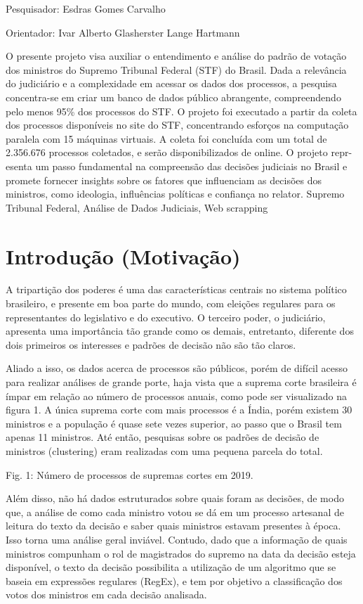     {
        \noindent Pesquisador: Esdras Gomes Carvalho

        \noindent Orientador: Ivar Alberto Glasherster Lange Hartmann
    }
    {O presente projeto visa auxiliar o entendimento e análise do padrão de votação dos ministros do Supremo Tribunal Federal (STF) do Brasil. Dada a relevância do judiciário e a complexidade em acessar os dados dos processos, a pesquisa concentra-se em criar um banco de dados público abrangente, compreendendo pelo menos 95\% dos processos do STF. O projeto foi executado a partir da coleta dos processos disponíveis no site do STF, concentrando esforços na computação paralela com 15 máquinas virtuais. A coleta foi concluída com um total de 2.356.676 processos coletados, e serão disponibilizados de online. O projeto repr-esenta um passo fundamental na compreensão das decisões judiciais no Brasil e promete fornecer insights sobre os fatores que influenciam as decisões dos ministros, como ideologia, influências políticas e confiança no relator.
    }
    {Supremo Tribunal Federal, Análise de Dados Judiciais, Web scrapping}


\section{Introdução (Motivação)}

	A tripartição dos poderes é uma das características centrais no sistema político brasileiro, e presente em boa parte do mundo, com eleições regulares para os representantes do legislativo e do executivo. O terceiro poder, o judiciário, apresenta uma importância tão grande como os demais, entretanto, diferente dos dois primeiros os interesses e padrões de decisão não são tão claros.
    
	Aliado a isso, os dados acerca de processos são públicos, porém de difícil acesso para realizar análises de grande porte, haja vista que a suprema corte brasileira é ímpar em relação ao número de processos anuais, como pode ser visualizado na figura 1. A única suprema corte com mais processos é a Índia, porém existem 30 ministros e a população é quase sete vezes superior, ao passo que o Brasil tem apenas 11 ministros. Até então, pesquisas sobre os padrões de decisão de ministros (clustering) eram realizadas com uma pequena parcela do total. 

Fig. 1: Número de processos de supremas cortes em 2019.

	Além disso, não há dados estruturados sobre quais foram as decisões, de modo que, a análise de como cada ministro votou se dá em um processo artesanal de leitura do texto da decisão e saber quais ministros estavam presentes à época. Isso torna uma análise geral inviável. Contudo, dado que a informação de quais ministros compunham o rol de magistrados do supremo na data da decisão esteja disponível, o texto da decisão possibilita a utilização de um algoritmo que se baseia em expressões regulares (RegEx), e tem por objetivo a classificação dos votos dos ministros em cada decisão analisada.

